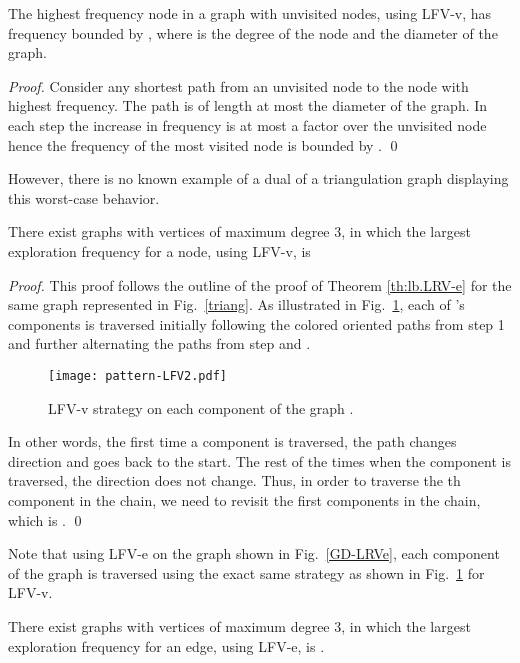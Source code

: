 \begin{theorem}\label{thm:LFVv-delta-d}
The highest frequency node in a graph with unvisited nodes, using LFV-v, has frequency
bounded by , where  is the degree of the node and  the
diameter of the graph.
\end{theorem}
\begin{proof}
Consider any shortest path from an unvisited node to the node with highest frequency.
The path is of length at most the diameter  of the graph. In each step
the increase in frequency is at most a factor  over the unvisited node
hence the frequency of the most visited node is bounded by .
\qed
\end{proof}
However, there is no known example of a dual of a triangulation graph
displaying this worst-case behavior.
\begin{theorem}\label{LFVv-lb}
There exist graphs with  vertices of maximum degree 3, in which the largest
exploration frequency for a node, using LFV-v, is 
\end{theorem}
\begin{proof}
This proof follows the outline of the proof of Theorem \ref{th:lb.LRV-e}
for the same graph  represented in Fig.~\ref{triang}.
As illustrated in Fig.~\ref{LFVv}, each of 's components is traversed
initially following the colored oriented paths from step 1 and further
alternating the paths from step  and .


\begin{figure}[h]\centering
 \texttt{[image: pattern-LFV2.pdf]}
\caption{LFV-v strategy on each component of the graph .} \label{LFVv}
 \end{figure}
In other words, the first time a component is traversed, the path
changes direction and goes back to the start. The rest of the times
when the component is traversed, the direction does not change. Thus, in order to traverse the th component in the chain, we need
to revisit the first  components in the chain, which is .
\qed
\end{proof}

Note that using LFV-e on the graph shown in Fig.~\ref{GD-LRVe}, each component of the graph is traversed using the exact same
strategy as shown in Fig.~\ref{LFVv} for LFV-v.\begin{theorem}\label{LFVe-lb}
There exist graphs with  vertices of maximum degree 3, in which
the largest exploration frequency for an edge, using LFV-e, is .
\end{theorem}


